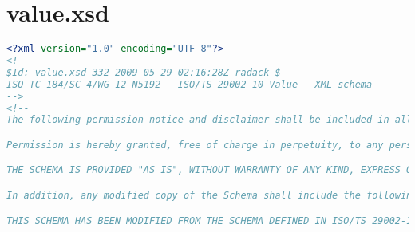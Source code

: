 \section{value.xsd}
 \begin{lstlisting}[caption=value.xsd, language=XML, label=lst:value_xsd]
<?xml version="1.0" encoding="UTF-8"?>
<!--
$Id: value.xsd 332 2009-05-29 02:16:28Z radack $
ISO TC 184/SC 4/WG 12 N5192 - ISO/TS 29002-10 Value - XML schema
-->
<!--
The following permission notice and disclaimer shall be included in all copies of this XML schema ("the Schema"), and derivations of the Schema:

Permission is hereby granted, free of charge in perpetuity, to any person obtaining a copy of the Schema, to use, copy, modify, merge and distribute free of charge, copies of the Schema for the purposes of developing, implementing, installing and using software based on the  Schema, and to permit persons to whom the Schema is furnished to do so, subject to the following conditions:

THE SCHEMA IS PROVIDED "AS IS", WITHOUT WARRANTY OF ANY KIND, EXPRESS OR IMPLIED, INCLUDING BUT NOT LIMITED TO THE WARRANTIES OF MERCHANTABILITY, FITNESS FOR A PARTICULAR PURPOSE AND NONINFRINGEMENT. IN NO EVENT SHALL THE AUTHORS OR COPYRIGHT HOLDERS BE LIABLE FOR ANY CLAIM, DAMAGES OR OTHER LIABILITY, WHETHER IN AN ACTION OF CONTRACT, TORT OR OTHERWISE, ARISING FROM, OUT OF OR IN CONNECTION WITH THE SCHEMA OR THE USE OR OTHER DEALINGS IN THE SCHEMA.

In addition, any modified copy of the Schema shall include the following notice:

THIS SCHEMA HAS BEEN MODIFIED FROM THE SCHEMA DEFINED IN ISO/TS 29002-10, AND SHOULD NOT BE INTERPRETED AS COMPLYING WITH THAT STANDARD.


\end{lstlisting}
